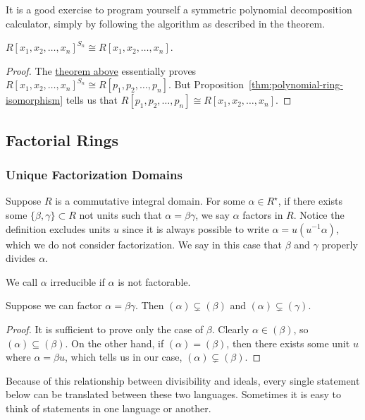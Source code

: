 \begin{remark}
    It is a good exercise to program yourself
    a symmetric polynomial decomposition calculator,
    simply by following the algorithm as described in the theorem.
\end{remark}
\begin{corollary}
    \({R[x_1,x_2,\hdots,x_n]}^{S_n} \cong R[x_1,x_2,\hdots,x_n]\).
\end{corollary}
\begin{proof}
    The \hyperref[thm:fundamental-sym-polynomial]{theorem above}
    essentially proves \({R[x_1,x_2,\hdots,x_n]}^{S_n} \cong R[p_1,p_2,\hdots,p_n]\).
    But Proposition~\ref{thm:polynomial-ring-isomorphism}
    tells us that \(R[p_1,p_2,\hdots,p_n] \cong R[x_1,x_2,\hdots,x_n]\).
\end{proof}


\subsection{Factorial Rings}\label{sec:factorial-rings}

\subsubsection*{Unique Factorization Domains}

\begin{definition}
    Suppose \(R\) is a commutative integral domain.
    For some \(\alpha \in R^\star\),
    if there exists some \(\{\beta,\gamma\} \subset R\) not units
    such that \(\alpha = \beta\gamma\),
    we say \(\alpha\) factors in \(R\).
    Notice the definition excludes units \(u\)
    since it is always possible to write \(\alpha = u(u^{-1}\alpha)\),
    which we do not consider factorization.
    We say in this case that \(\beta\) and \(\gamma\) properly divides \(\alpha\).
\end{definition}
\begin{definition}
    We call \(\alpha\) irreducible if \(\alpha\) is not factorable.
\end{definition}
\begin{proposition}
    Suppose we can factor \(\alpha = \beta\gamma\).
    Then \((\alpha) \subsetneq (\beta)\) and \((\alpha) \subsetneq (\gamma)\).
\end{proposition}
\begin{proof}
    It is sufficient to prove only the case of \(\beta\).
    Clearly \(\alpha \in (\beta)\), so \((\alpha) \subseteq (\beta)\).
    On the other hand, if \((\alpha) = (\beta)\),
    then there exists some unit \(u\) where \(\alpha = \beta u\),
    which tells us in our case, \((\alpha) \subsetneq (\beta)\).
\end{proof}
\begin{remark}
    Because of this relationship between divisibility and ideals,
    every single statement below
    can be translated between these two languages.
    Sometimes it is easy to think of statements in one language or another.
\end{remark}

